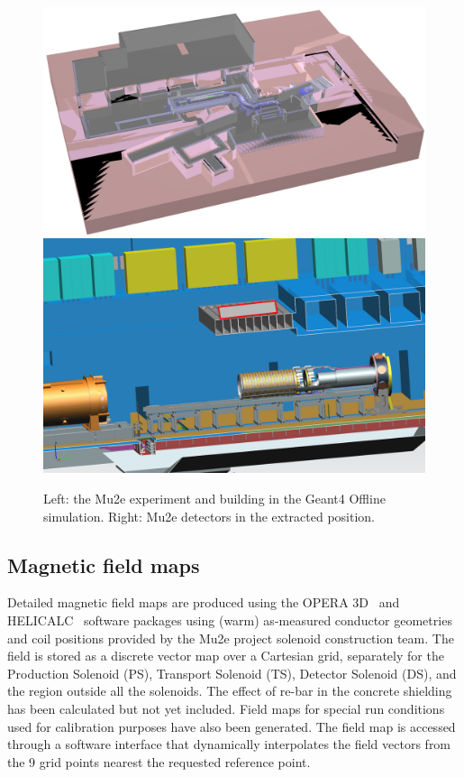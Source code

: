 \begin{figure}[ht!]
\begin{center}
\includegraphics[height=0.29\linewidth]{figures/mu2eHall.png}
\includegraphics[height=0.29\linewidth]{figures/geom_extracted.png}
\caption{Left: the Mu2e experiment and building in the Geant4 Offline simulation. Right: Mu2e detectors in the extracted position.}
\label{fig:mu2e_geom}
\end{center}
\end{figure}


\subsection{Magnetic field maps}
Detailed magnetic field maps are produced using the OPERA 3D~\cite{opera3D} and HELICALC~\cite{helicalc} software packages using (warm) as-measured conductor geometries and coil positions provided by the Mu2e project solenoid construction team. The field is stored as a discrete vector map over a Cartesian grid, separately for the Production Solenoid (PS), Transport Solenoid (TS), Detector Solenoid (DS), and the region outside all the solenoids. The effect of re-bar in the concrete shielding has been calculated but not yet included. Field maps for special run conditions used for calibration purposes have also been generated. The field map is accessed through a software interface that dynamically interpolates the field vectors from the 9 grid points nearest the requested reference point.

